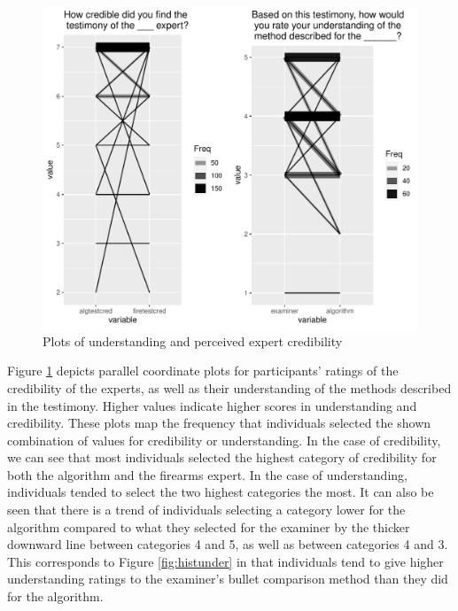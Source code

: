 \documentclass[print]{nuthesis}
\begin{document}
\begin{figure}

{\centering \includegraphics[width=\linewidth]{thesis_files/figure-latex/coordcred-1} 

}

\caption{Plots of understanding and perceived expert credibility}\label{fig:coordcred}
\end{figure}

Figure \ref{fig:coordcred} depicts parallel coordinate plots for participants' ratings of the credibility of the experts, as well as their understanding of the methods described in the testimony.
Higher values indicate higher scores in understanding and credibility. These plots map the frequency that individuals selected the shown combination of values for credibility or understanding.
In the case of credibility, we can see that most individuals selected the highest category of credibility for both the algorithm and the firearms expert.
In the case of understanding, individuals tended to select the two highest categories the most.
It can also be seen that there is a trend of individuals selecting a category lower for the algorithm compared to what they selected for the examiner by the thicker downward line between categories 4 and 5, as well as between categories 4 and 3.
This corresponds to Figure \ref{fig:histunder} in that individuals tend to give higher understanding ratings to the examiner's bullet comparison method than they did for the algorithm.
\end{document}
